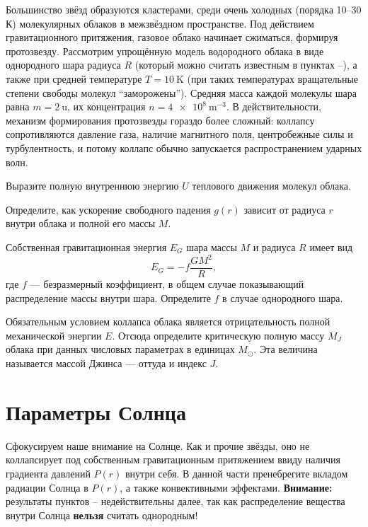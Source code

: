 Большинство звёзд образуются кластерами, среди очень холодных (порядка 10--30 К) молекулярных облаков в межзвёздном пространстве. Под действием гравитационного притяжения, газовое облако начинает сжиматься, формируя протозвезду. Рассмотрим упрощённую модель водородного облака в виде однородного шара радиуса $R$ (который можно считать известным в пунктах --), а также при средней температуре $T=\qty{10}{\K}$ (при таких температурах вращательные степени свободы молекул ``заморожены''). Средняя масса каждой молекулы шара равна $m=\qty{2}{\amu}$, их концентрация $n=\qty{4e8}{\m\tothe{-3}}$. В действительности, механизм формирования протозвезды гораздо более сложный: коллапсу сопротивляются давление газа, наличие магнитного поля, центробежные силы и турбулентность, и потому коллапс обычно запускается распространением ударных волн.

\begin{task}
    \item Выразите полную внутреннюю энергию $U$ теплового движения молекул облака.
    \item Определите, как ускорение свободного падения $g(r)$ зависит от радиуса $r$ внутри облака и полной его массы $M$.
    \item Собственная гравитационная энергия $E_G$ шара массы $M$ и радиуса $R$ имеет вид
    $$
    E_G = -f\frac{GM^2}{R},
    $$
    где $f$ --- безразмерный коэффициент, в общем случае показывающий распределение массы внутри шара. Определите $f$ в случае однородного шара.
    \item Обязательным условием коллапса облака является отрицательность полной механической энергии $E$. Отсюда определите критическую полную массу $M_J$ облака при данных числовых параметрах в единицах $M_\odot$. Эта величина называется массой Джинса --- оттуда и индекс $J$.
\end{task}

\part{Параметры Солнца}

Сфокусируем наше внимание на Солнце. Как и прочие звёзды, оно не коллапсирует под собственным гравитационным притяжением ввиду наличия градиента давлений $P(r)$ внутри себя. В данной части пренебрегите вкладом радиации Солнца в $P(r)$, а также конвективными эффектами. \textbf{Внимание:} результаты пунктов -- недействительны далее, так как распределение вещества внутри Солнца \textbf{нельзя} считать однородным!

